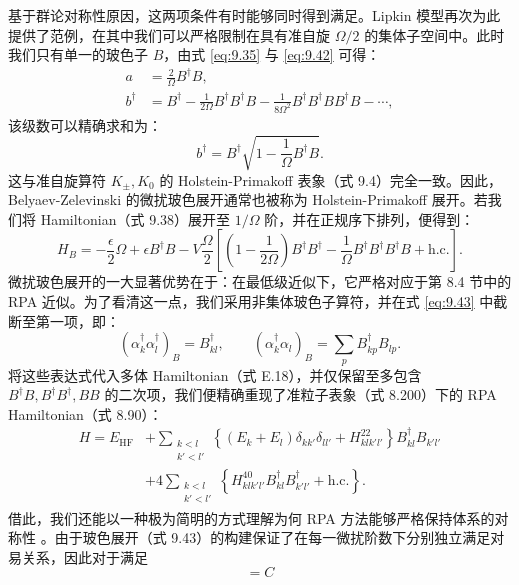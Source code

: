 基于群论对称性原因，这两项条件有时能够同时得到满足。Lipkin 模型再次为此提供了范例，在其中我们可以严格限制在具有准自旋 $\Omega/2$
的集体子空间中。此时我们只有单一的玻色子 $B$，由式 \ref{eq:9.35} 与 \ref{eq:9.42} 可得：
\begin{align}
a & =\frac{2}{\Omega}B^{\dagger}B,\nonumber \\
b^{\dagger} & =B^{\dagger}-\frac{1}{2\Omega}B^{\dagger}B^{\dagger}B-\frac{1}{8\Omega^{2}}B^{\dagger}B^{\dagger}BB^{\dagger}B-\cdots,\label{eq:9.45}
\end{align}
该级数可以精确求和为：
\begin{equation}
b^{\dagger}=B^{\dagger}\sqrt{1-\frac{1}{\Omega}B^{\dagger}B}.\label{eq:9.46}
\end{equation}
这与准自旋算符 $K_{\pm},K_{0}$ 的 Holstein-Primakoff 表象（式 9.4）完全一致。因此，Belyaev-Zelevinski
的微扰玻色展开通常也被称为 Holstein-Primakoff 展开。若我们将 Hamiltonian（式 9.38）展开至 $1/\Omega$
阶，并在正规序下排列，便得到：
\begin{equation}
H_{B}=-\frac{\epsilon}{2}\Omega+\epsilon B^{\dagger}B-V\frac{\Omega}{2}\left[\left(1-\frac{1}{2\Omega}\right)B^{\dagger}B^{\dagger}-\frac{1}{\Omega}B^{\dagger}B^{\dagger}B^{\dagger}B+\text{h.c.}\right].\label{eq:9.47}
\end{equation}
微扰玻色展开的一大显著优势在于：在最低级近似下，它严格对应于第 8.4 节中的 RPA 近似。为了看清这一点，我们采用非集体玻色子算符，并在式
\ref{eq:9.43} 中截断至第一项，即：
\[
(\alpha^{\dagger}_{k}\alpha^{\dagger}_{l})_{B}=B^{\dagger}_{kl},\qquad(\alpha^{\dagger}_{k}\alpha_{l})_{B}=\sum_{p}B^{\dagger}_{kp}B_{lp}.
\]
将这些表达式代入多体 Hamiltonian（式 E.18），并仅保留至多包含 $B^{\dagger}B,B^{\dagger}B^{\dagger},BB$
的二次项，我们便精确重现了准粒子表象（式 8.200）下的 RPA Hamiltonian（式 8.90）：
\begin{align}
H=E_{\text{HF}} & +\sum_{\substack{k<l\\
k'<l'
}
}\left\{ (E_{k}+E_{l})\delta_{kk'}\delta_{ll'}+H^{22}_{klk'l'}\right\} B^{\dagger}_{kl}B_{k'l'}\nonumber \\
 & +4\sum_{\substack{k<l\\
k'<l'
}
}\left\{ H^{40}_{klk'l'}B^{\dagger}_{kl}B^{\dagger}_{k'l'}+\text{h.c.}\right\} .\label{eq:9.48}
\end{align}
借此，我们还能以一种极为简明的方式理解为何 RPA 方法能够严格保持体系的对称性 \cite{Ma74}。由于玻色展开（式 9.43）的构建保证了在每一微扰阶数下分别独立满足对易关系，因此对于满足
\begin{equation}
[A,B]=C\label{eq:9.49}
\end{equation}
